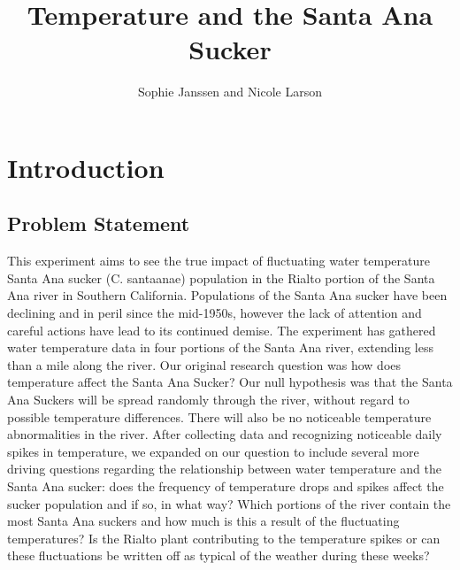 \documentclass{article}
\title{Temperature and the Santa Ana Sucker}
\author{Sophie Janssen and Nicole Larson}
\begin{document}


\maketitle

\newpage
\tableofcontents
\newpage

\section{Introduction}

\subsection{Problem Statement}
This experiment aims to see the true impact of fluctuating water temperature Santa Ana sucker (C. santaanae) population in the Rialto portion of the Santa Ana river in Southern California. Populations of the Santa Ana sucker have been declining and in peril since the mid-1950s, however the lack of attention and careful actions have lead to its continued demise. The experiment has gathered water temperature data in four portions of the Santa Ana river, extending less than a mile along the river. Our original research question was how does temperature affect the Santa Ana Sucker? Our null hypothesis was that the Santa Ana Suckers will be spread randomly through the river, without regard to possible temperature differences. There will also be no noticeable temperature abnormalities in the river. After collecting data and recognizing noticeable daily spikes in temperature, we expanded on our question to include several more driving questions regarding the relationship between water temperature and the Santa Ana sucker: does the frequency of temperature drops and spikes affect the sucker population and if so, in what way? Which portions of the river contain the most Santa Ana suckers and how much is this a result of the fluctuating temperatures? Is the Rialto plant contributing to the temperature spikes or can these fluctuations be written off as typical of the weather during these weeks?
\end{document}
